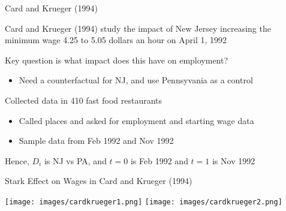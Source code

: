 \documentclass[notes,11pt, aspectratio=169]{beamer}
\newenvironment{wideitemize}{\itemize\addtolength{\itemsep}{10pt}}{\enditemize}
\begin{document}
\begin{frame}{Card and Krueger (1994)}
  \begin{wideitemize}
  \item Card and Krueger (1994) study the impact of New Jersey
    increasing the minimum wage 4.25 to 5.05 dollars an hour on April
    1, 1992
  \item Key question is what impact does this have on employment?
    \begin{itemize}
    \item Need a counterfactual for NJ, and use Pennsyvania as a control
    \end{itemize}
  \item Collected data in 410 fast food restaurants
    \begin{itemize}
    \item Called places and asked for employment and starting wage data
    \item Sample data from Feb 1992 and Nov 1992
    \end{itemize}
  \item Hence, $D_{i}$ is NJ vs PA, and $t=0$ is Feb 1992 and $t = 1$ is Nov 1992
  \end{wideitemize}
\end{frame}

\begin{frame}{Stark Effect on Wages in Card and Krueger (1994) }
  \begin{center}
    \texttt{[image: images/cardkrueger1.png]}   \texttt{[image: images/cardkrueger2.png]}
    \end{center}
\end{frame}
\end{document}

